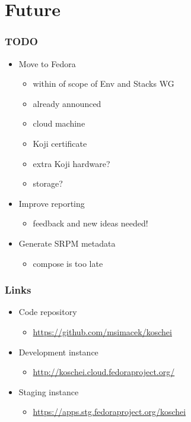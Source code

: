 \documentclass[pdftex,unicode,xcolor=table]{beamer}
\begin{document}
\section{Future}
\begin{frame}
  \frametitle{TODO}
  \begin{itemize}
    \item Move to Fedora
    \begin{itemize}
      \item within of scope of Env and Stacks WG
      \item already announced
      \item cloud machine
      \item Koji certificate
      \item extra Koji hardware?
      \item storage?
    \end{itemize}
    \item Improve reporting
    \begin{itemize}
      \item feedback and new ideas needed!
    \end{itemize}
    \item Generate SRPM metadata
    \begin{itemize}
      \item compose is too late
    \end{itemize}
  \end{itemize}
\end{frame}

\begin{frame}
  \frametitle{Links}
  \begin{itemize}
    \item Code repository
    \begin{itemize}
      \item \url{https://github.com/msimacek/koschei}
    \end{itemize}
    \item Development instance
    \begin{itemize}
      \item \url{http://koschei.cloud.fedoraproject.org/}
    \end{itemize}
    \item Staging instance
    \begin{itemize}
      \item \url{https://apps.stg.fedoraproject.org/koschei}
    \end{itemize}
  \end{itemize}
\end{frame}


 {
  \Rhbg{\frame{\theend}}
}
\end{document}

